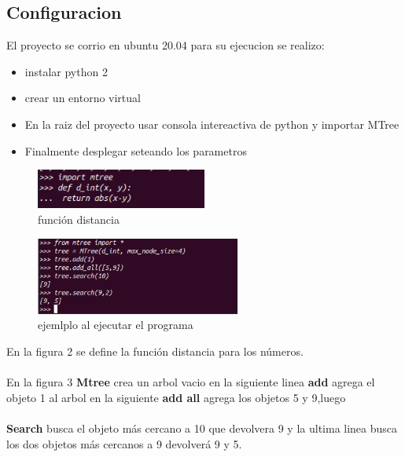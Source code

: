 \documentclass[a4paper]{article}
\begin{document}
\subsection{Configuracion}




El proyecto se corrio en ubuntu 20.04 para su ejecucion se realizo:

\begin{itemize}

\item  instalar python 2

\item crear un entorno virtual


\item  En la raiz del proyecto usar consola intereactiva de python y importar MTree

\item Finalmente desplegar seteando los parametros

\end{itemize}

   

    

   

    


\begin{figure}[H]
  \centering
  \includegraphics[width=0.5\textwidth]{imagenes/Captura de pantalla de 2021-12-15 23-51-51.png}
  \caption{función distancia}
\end{figure}

\begin{figure}[H]
  \centering
  \includegraphics[width=0.6\textwidth]{imagenes/test.png}
  \caption{ejemlplo al ejecutar el programa}
\end{figure}

\noindent
En la figura 2 se  define la función distancia para los números.\\\\En la figura 3
\textbf{Mtree} crea un arbol vacio en la siguiente linea  \textbf{add }agrega el objeto 1 al arbol en la siguiente  \textbf{add all} agrega los objetos 5 y 9,luego \\\\ \textbf{Search} busca el objeto más cercano a 10 que devolvera 9
y la ultima linea busca los dos objetos más cercanos a 9 devolverá 9 y 5.
\\
\\
\end{document}
